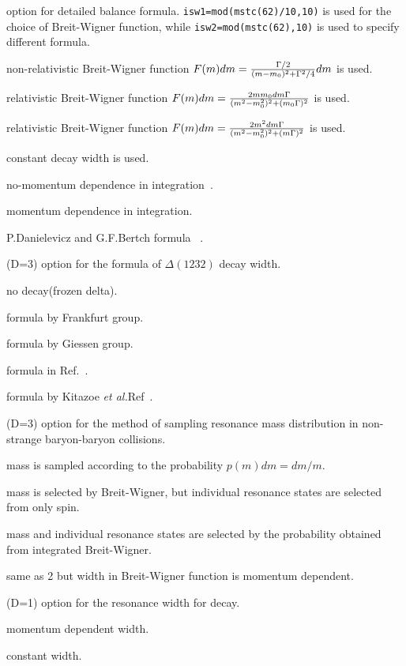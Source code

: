 \documentclass[]{article}
\newenvironment{entry}%
{\begin{list}{}{\setlength{\topsep}{0mm} \setlength{\itemsep}{0mm}
\setlength{\parskip}{0mm} \setlength{\parsep}{0mm}
\setlength{\leftmargin}{20mm} \setlength{\rightmargin}{0mm}
\setlength{\labelwidth}{18mm} \setlength{\labelsep}{2mm}}}%
{\end{list}}
\newenvironment{subentry}%
{\begin{list}{}{\setlength{\topsep}{0mm} \setlength{\itemsep}{0mm}
\setlength{\parskip}{0mm} \setlength{\parsep}{0mm}
\setlength{\leftmargin}{10mm} \setlength{\rightmargin}{0mm}
\setlength{\labelwidth}{18mm} \setlength{\labelsep}{2mm}}}%
{\end{list}}
\newcommand{\ttt}[1]{{\tt#1}}
\newcommand{\itemt}[1]{\item[{\tt #1}\hfill]}
\def\etal{{\it et al.}}
\begin{document}
\begin{entry}
\itemt{mstc(62)(D=22) :} option for detailed balance formula.
  \ttt{isw1=mod(mstc(62)/10,10)} is used for the choice of
   Breit-Wigner function, while \ttt{isw2=mod(mstc(62),10)}
   is used to specify different formula.
\begin{subentry}
   \itemt{isw1$=1$:} non-relativistic Breit-Wigner function
                     $F(m)dm={\Gamma/2 \over (m-m_0)^2 + \Gamma^2/4}dm$
                     is used.
   \itemt{isw1$=2$:} relativistic Breit-Wigner function
                   $F(m)dm={2mm_0dm\Gamma \over (m^2-m_0^2)^2 + (m_0\Gamma)^2}$
                     is used.
   \itemt{isw1$=3$:} relativistic Breit-Wigner function
                    $F(m)dm={2m^2dm\Gamma \over (m^2-m_0^2)^2 + (m\Gamma)^2}$
                     is used.
   \itemt{isw2$=0$:} constant decay width is used.
   \itemt{isw2$=1$:} no-momentum dependence in integration~\cite{detbal1}.
   \itemt{isw2$=2$:} momentum dependence in integration.
   \itemt{isw2$=3$:} P.Danielevicz and G.F.Bertch formula
                         ~\cite{detbal1,detbal2}.
\end{subentry}

\itemt{mstc(63) :}(D=3) option for the formula of $\Delta(1232)$ decay width.
 \begin{subentry}
  \itemt{$=0$:} no decay(frozen delta).
  \itemt{$=1$:} formula by Frankfurt group.
  \itemt{$=2$:} formula by Giessen group.
  \itemt{$=3$:} formula in Ref.~\cite{dwid1}.
  \itemt{$=4$:} formula by Kitazoe \etal Ref~\cite{Kitazoe}.
 \end{subentry}

\itemt{mstc(64) :}(D=3) option for the method of sampling resonance mass
                        distribution in non-strange baryon-baryon collisions.
 \begin{subentry}
  \itemt{$=0$:} mass is sampled according to the probability $p(m)dm= dm/m$.
  \itemt{$=1$:} mass is selected by Breit-Wigner,
                but individual resonance states are selected from only spin.
  \itemt{$=2$:} mass and individual resonance states are selected by
                the probability obtained from integrated Breit-Wigner.
  \itemt{$=3$:} same as 2 but width in Breit-Wigner function
                is momentum dependent.
 \end{subentry}

\itemt{mstc(65) :} (D=1) option for the resonance width for decay.
 \begin{subentry}
         \itemt{$=1$ :} momentum dependent width.
         \itemt{$=0$ :} constant width.
 \end{subentry}


\end{entry}
\end{document}
